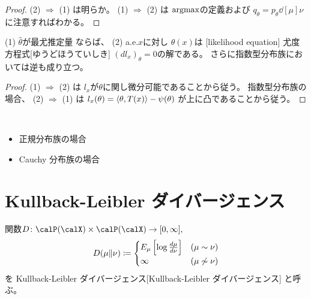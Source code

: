 \documentclass[report]{jlreq}
\begin{document}
\begin{proof}
    (2) $\Rightarrow$ (1) は明らか。
    (1) $\Rightarrow$ (2) は
    $\operatorname{argmax}$の定義および
    $q_\theta = p_\theta \dd[\mu]{\nu}$に注意すればわかる。
\end{proof}

\begin{proposition}[尤度方程式]
    (1) $\hat{\theta}$が最尤推定量
    ならば、
    (2) a.e.$x$に対し
    $\hat{\theta}(x)$は
    [likelihood equation]
        {尤度方程式}[ゆうどほうていしき]
    $(dl_x)_\theta = 0$の解である。
    さらに指数型分布族においては逆も成り立つ。
\end{proposition}

\begin{proof}
    (1) $\Rightarrow$ (2) は
    $l_x$が$\theta$に関し微分可能であることから従う。
    指数型分布族の場合、
    (2) $\Rightarrow$ (1) は
    $l_x(\theta) = \left\langle{\theta},{T(x)}\right\rangle - \psi(\theta)$
    が上に凸であることから従う。
\end{proof}

\begin{example}[最尤推定量の例]
    ~
    \begin{itemize}
        \item 正規分布族の場合
        \item Cauchy 分布族の場合
    \end{itemize}
\end{example}

%
\section{Kullback-Leibler ダイバージェンス}

\begin{definition}
    関数$D \colon \calP(\calX) \times \calP(\calX) \to [0, \infty],$
    \begin{equation}
        D(\mu \| \nu)
            \coloneqq
                \begin{cases}
                    E_\mu \left[{
                        \log \frac{d\mu}{d\nu}
                    }\right]
                        & (\mu \sim \nu) \\
                    \infty
                        & (\mu \not\sim \nu)
                \end{cases}
    \end{equation}
    を
        {Kullback-Leibler ダイバージェンス}[Kullback-Leibler ダイバージェンス]
    と呼ぶ。
\end{definition}
\end{document}
